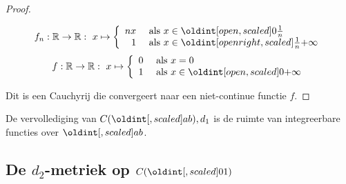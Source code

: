 \documentclass[main.tex]{subfiles}
\begin{document}
\begin{vb}
\begin{proof}
    \noindent
    \begin{minipage}{.45\textwidth}
      \begin{figure}[H]
        \centering
      \end{figure}
    \end{minipage}
    \begin{minipage}{.45\textwidth}
      \[
      f_{n}: \mathbb{R} \rightarrow \mathbb{R}:\ x \mapsto
      \left\{
        \begin{array}{rl}
          nx & \text{ als } x \in \interval[open      ]{0}{\frac{1}{n}}\\
          1  & \text{ als } x \in \interval[open right]{\frac{1}{n}}{+\infty}\\
        \end{array}
      \right.
      \]
      \[
      f: \mathbb{R} \rightarrow \mathbb{R}:\ x \mapsto
      \left\{
        \begin{array}{rl}
          0  & \text{ als } x = 0\\
          1  & \text{ als } x \in \interval[open]{0}{+\infty}\\
        \end{array}
      \right.
      \]
    \end{minipage}
    Dit is een Cauchyrij die convergeert naar een niet-continue functie $f$.
  \end{proof}
\end{vb}

\begin{vb}
  De vervollediging van $C(\interval{a}{b}),d_{1}$ is de ruimte van integreerbare functies over $\interval{a}{b}$.
\end{vb}

\subsection{De $d_2$-metriek op $C(\interval{0}{1})$}
\label{sec:de-d_2-metriek}
\end{document}
